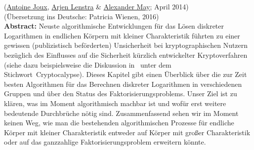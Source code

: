 \begin{refsegment}
\label{Chapter_Dlog-FactoringDead}

(\hyperlink{author_Antoine-Joux}{Antoine Joux}, \hyperlink{author_Arjen-Lenstra}{Arjen Lenstra} \& \hyperlink{author_Alexander-May}{Alexander May}; April 2014)\\

(Übersetzung ins Deutsche: Patricia Wienen, 2016)\\



\textbf{Abstract:}
Neuste algorithmische Entwicklungen für das Lösen diskreter Logarithmen in endlichen
Körpern mit kleiner Charakteristik führten zu einer gewissen (publizistisch beförderten)
Unsicherheit bei kryptographischen Nutzern bezüglich des Einflusses auf die Sicherheit kürzlich entwickelter Kryptoverfahren (siehe dazu beispielsweise die Diskussion in~\cite{Blackhat2013} unter dem Stichwort~\glqq Cryptocalypse\grqq).   Dieses Kapitel gibt einen Überblick über die zur Zeit besten Algorithmen für das Berechnen diskreter Logarithmen in verschiedenen Gruppen und über den Status des Faktorisierungsproblems. Unser Ziel ist zu klären, was im Moment algorithmisch machbar ist und wofür erst weitere bedeutende Durchbrüche nötig sind. Zusammenfassend sehen wir im Moment keinen Weg, wie man die bestehenden algorithmischen Prozesse für endliche Körper mit kleiner Charakteristik entweder auf Körper mit großer Charakteristik oder auf das ganzzahlige Faktorisierungsproblem erweitern könnte.



\end{refsegment}
